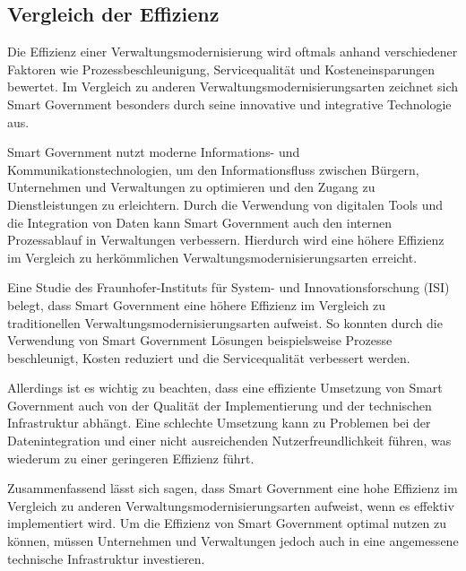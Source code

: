 \subsection{Vergleich der Effizienz}
Die Effizienz einer Verwaltungsmodernisierung wird oftmals anhand verschiedener Faktoren wie Prozessbeschleunigung, Servicequalität und Kosteneinsparungen bewertet. 
Im Vergleich zu anderen Verwaltungsmodernisierungsarten zeichnet sich Smart Government besonders durch seine innovative und integrative Technologie aus.
\par
Smart Government nutzt moderne Informations- und Kommunikationstechnologien, um den Informationsfluss zwischen Bürgern, Unternehmen und Verwaltungen zu optimieren und den Zugang zu Dienstleistungen zu erleichtern. 
Durch die Verwendung von digitalen Tools und die Integration von Daten kann Smart Government auch den internen Prozessablauf in Verwaltungen verbessern. 
Hierdurch wird eine höhere Effizienz im Vergleich zu herkömmlichen Verwaltungsmodernisierungsarten erreicht.
\par
Eine Studie des Fraunhofer-Instituts für System- und Innovationsforschung (ISI) belegt, dass Smart Government eine höhere Effizienz im Vergleich zu traditionellen Verwaltungsmodernisierungsarten aufweist. 
So konnten durch die Verwendung von Smart Government Lösungen beispielsweise Prozesse beschleunigt, Kosten reduziert und die Servicequalität verbessert werden.
\par
Allerdings ist es wichtig zu beachten, dass eine effiziente Umsetzung von Smart Government auch von der Qualität der Implementierung und der technischen Infrastruktur abhängt. 
Eine schlechte Umsetzung kann zu Problemen bei der Datenintegration und einer nicht ausreichenden Nutzerfreundlichkeit führen, was wiederum zu einer geringeren Effizienz führt.
\par
Zusammenfassend lässt sich sagen, dass Smart Government eine hohe Effizienz im Vergleich zu anderen Verwaltungsmodernisierungsarten aufweist, wenn es effektiv implementiert wird. 
Um die Effizienz von Smart Government optimal nutzen zu können, müssen Unternehmen und Verwaltungen jedoch auch in eine angemessene technische Infrastruktur investieren.